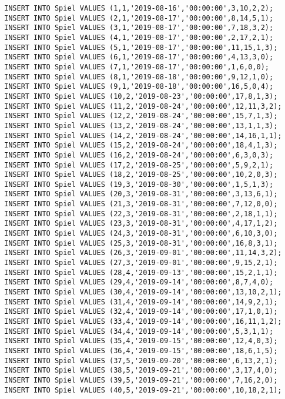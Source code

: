 \documentclass{lehramt-informatik-aufgabe}
\begin{document}
\begin{verbatim}
INSERT INTO Spiel VALUES (1,1,'2019-08-16','00:00:00',3,10,2,2);
INSERT INTO Spiel VALUES (2,1,'2019-08-17','00:00:00',8,14,5,1);
INSERT INTO Spiel VALUES (3,1,'2019-08-17','00:00:00',7,18,3,2);
INSERT INTO Spiel VALUES (4,1,'2019-08-17','00:00:00',2,17,2,1);
INSERT INTO Spiel VALUES (5,1,'2019-08-17','00:00:00',11,15,1,3);
INSERT INTO Spiel VALUES (6,1,'2019-08-17','00:00:00',4,13,3,0);
INSERT INTO Spiel VALUES (7,1,'2019-08-17','00:00:00',1,6,0,0);
INSERT INTO Spiel VALUES (8,1,'2019-08-18','00:00:00',9,12,1,0);
INSERT INTO Spiel VALUES (9,1,'2019-08-18','00:00:00',16,5,0,4);
INSERT INTO Spiel VALUES (10,2,'2019-08-23','00:00:00',17,8,1,3);
INSERT INTO Spiel VALUES (11,2,'2019-08-24','00:00:00',12,11,3,2);
INSERT INTO Spiel VALUES (12,2,'2019-08-24','00:00:00',15,7,1,3);
INSERT INTO Spiel VALUES (13,2,'2019-08-24','00:00:00',13,1,1,3);
INSERT INTO Spiel VALUES (14,2,'2019-08-24','00:00:00',14,16,1,1);
INSERT INTO Spiel VALUES (15,2,'2019-08-24','00:00:00',18,4,1,3);
INSERT INTO Spiel VALUES (16,2,'2019-08-24','00:00:00',6,3,0,3);
INSERT INTO Spiel VALUES (17,2,'2019-08-25','00:00:00',5,9,2,1);
INSERT INTO Spiel VALUES (18,2,'2019-08-25','00:00:00',10,2,0,3);
INSERT INTO Spiel VALUES (19,3,'2019-08-30','00:00:00',1,5,1,3);
INSERT INTO Spiel VALUES (20,3,'2019-08-31','00:00:00',3,13,6,1);
INSERT INTO Spiel VALUES (21,3,'2019-08-31','00:00:00',7,12,0,0);
INSERT INTO Spiel VALUES (22,3,'2019-08-31','00:00:00',2,18,1,1);
INSERT INTO Spiel VALUES (23,3,'2019-08-31','00:00:00',4,17,1,2);
INSERT INTO Spiel VALUES (24,3,'2019-08-31','00:00:00',6,10,3,0);
INSERT INTO Spiel VALUES (25,3,'2019-08-31','00:00:00',16,8,3,1);
INSERT INTO Spiel VALUES (26,3,'2019-09-01','00:00:00',11,14,3,2);
INSERT INTO Spiel VALUES (27,3,'2019-09-01','00:00:00',9,15,2,1);
INSERT INTO Spiel VALUES (28,4,'2019-09-13','00:00:00',15,2,1,1);
INSERT INTO Spiel VALUES (29,4,'2019-09-14','00:00:00',8,7,4,0);
INSERT INTO Spiel VALUES (30,4,'2019-09-14','00:00:00',13,10,2,1);
INSERT INTO Spiel VALUES (31,4,'2019-09-14','00:00:00',14,9,2,1);
INSERT INTO Spiel VALUES (32,4,'2019-09-14','00:00:00',17,1,0,1);
INSERT INTO Spiel VALUES (33,4,'2019-09-14','00:00:00',16,11,1,2);
INSERT INTO Spiel VALUES (34,4,'2019-09-14','00:00:00',5,3,1,1);
INSERT INTO Spiel VALUES (35,4,'2019-09-15','00:00:00',12,4,0,3);
INSERT INTO Spiel VALUES (36,4,'2019-09-15','00:00:00',18,6,1,5);
INSERT INTO Spiel VALUES (37,5,'2019-09-20','00:00:00',6,13,2,1);
INSERT INTO Spiel VALUES (38,5,'2019-09-21','00:00:00',3,17,4,0);
INSERT INTO Spiel VALUES (39,5,'2019-09-21','00:00:00',7,16,2,0);
INSERT INTO Spiel VALUES (40,5,'2019-09-21','00:00:00',10,18,2,1);

\end{verbatim}
\end{document}
